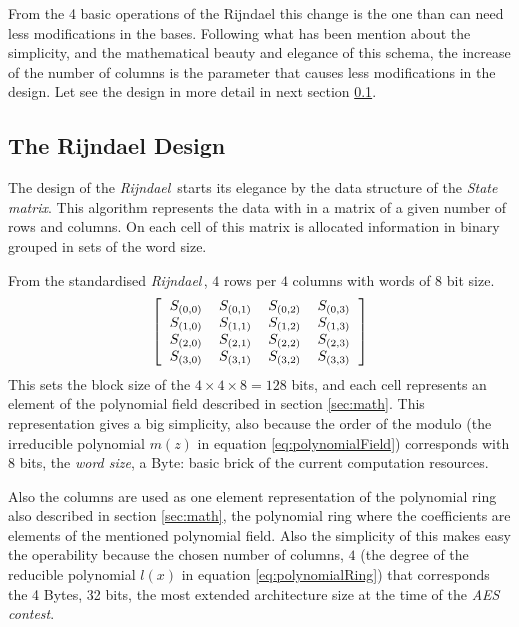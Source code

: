 \documentclass[10pt,a4paper,twoside]{llncs}
\newcommand{\rijndael}{\emph{Rijndael}}
\begin{document}
From the 4 basic operations of the Rijndael this change is the one than can need less modifications in the bases. Following what has been mention about the simplicity, and the mathematical beauty and elegance of this schema, the increase of the number of columns is the parameter that causes less modifications in the design. Let see the design in more detail in next section \ref{sec:design}.


\subsection{The Rijndael Design}\label{sec:design}

The design of the \rijndael\, starts its elegance by the data structure of the \emph{State matrix}. This algorithm represents the data with in a matrix of a given number of rows and columns. On each cell of this matrix is allocated information in binary grouped in sets of the word size.

From the standardised \rijndael\,, $4$ rows per $4$ columns with words of $8$ bit size.
\begin{equation}\label{eq:stateMatrix}
 \left[
 \begin{tabular}{cccc}
  $S_{(0,0)}$ & $S_{(0,1)}$ & $S_{(0,2)}$ & $S_{(0,3)}$ \\
  $S_{(1,0)}$ & $S_{(1,1)}$ & $S_{(1,2)}$ & $S_{(1,3)}$ \\
  $S_{(2,0)}$ & $S_{(2,1)}$ & $S_{(2,2)}$ & $S_{(2,3)}$ \\
  $S_{(3,0)}$ & $S_{(3,1)}$ & $S_{(3,2)}$ & $S_{(3,3)}$ \\
 \end{tabular}
 \right]
\end{equation}
This sets the block size of the $4\times4\times8=128$ bits, and each cell represents an element of the polynomial field described in section \ref{sec:math}. This representation gives a big simplicity, also because the order of the modulo (the irreducible polynomial $m(z)$ in equation \ref{eq:polynomialField}) corresponds with $8$ bits, the \emph{word size}, a Byte: basic brick of the current computation resources.

Also the columns are used as one element representation of the polynomial ring also described in section \ref{sec:math}, the polynomial ring where the coefficients are elements of the mentioned polynomial field. Also the simplicity of this makes easy the operability because the chosen number of columns, $4$ (the degree of the reducible polynomial $l(x)$ in equation \ref{eq:polynomialRing}) that corresponds the 4 Bytes, 32 bits, the most extended architecture size at the time of the \emph{AES contest}.
\end{document}
